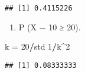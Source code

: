 \documentclass[
]{article}
\newenvironment{Shaded}{\begin{snugshade}}{\end{snugshade}}
\newcommand{\DecValTok}[1]{\textcolor[rgb]{0.00,0.00,0.81}{#1}}
\newcommand{\NormalTok}[1]{#1}
\newcommand{\OperatorTok}[1]{\textcolor[rgb]{0.81,0.36,0.00}{\textbf{#1}}}
\newcommand{\StringTok}[1]{\textcolor[rgb]{0.31,0.60,0.02}{#1}}
\providecommand{\tightlist}{%
  \setlength{\itemsep}{0pt}\setlength{\parskip}{0pt}}
\begin{document}
\begin{verbatim}
## [1] 0.4115226
\end{verbatim}

\begin{enumerate}
\def\labelenumi{(\alph{enumi})}
\setcounter{enumi}{3}
\tightlist
\item
  P (\textbar X − 10\textbar{} ≥ 20).
\end{enumerate}

\begin{Shaded}
\begin{Highlighting}[]
\NormalTok{k =}\StringTok{ }\DecValTok{20}\OperatorTok{/}\NormalTok{std}
\DecValTok{1}\OperatorTok{/}\NormalTok{k}\OperatorTok{^}\DecValTok{2}
\end{Highlighting}
\end{Shaded}

\begin{verbatim}
## [1] 0.08333333
\end{verbatim}
\end{document}
